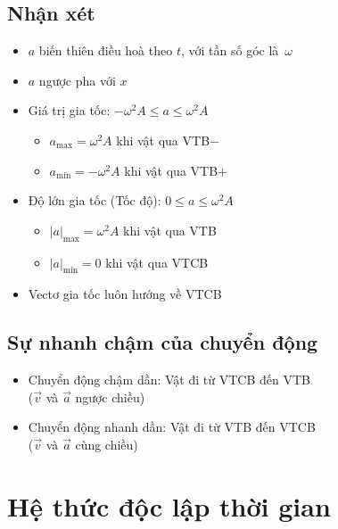\documentclass[12pt]{article}
\begin{document}
		\subsection{Nhận xét}
			\vspace{5pt}
			\begin{itemize}
				\item \(a\) biến thiên điều hoà theo \(t\), với tần số góc là \(\,\omega\)
				\item \(a\) ngược pha với \(x\)
				\item Giá trị gia tốc: \quad \( -\omega^2 A \leq a \leq \omega^2 A \)
					\begin{itemize}[label=\textopenbullet]
						\item \( a_\text{max} = \omega^2 A \) khi vật qua VTB\(-\)
						\item \( a_\text{min} = -\omega^2 A \) khi vật qua VTB\(+\)
					\end{itemize}
				\item Độ lớn gia tốc (Tốc độ): \quad \( 0 \leq a \leq \omega^2 A \)
					\begin{itemize}[label=\textopenbullet]
						\item \( {\lvert a \rvert}_\text{max} = \omega^2 A \) khi vật qua VTB
						\item \( {\lvert a \rvert}_\text{min} = 0 \) khi vật qua VTCB
					\end{itemize}
				\item Vectơ gia tốc luôn hướng về VTCB
			\end{itemize}
		\newpage
		\subsection{Sự nhanh chậm của chuyển động}
			\vspace{4pt}
			\begin{itemize}
				\item Chuyển động chậm dần: Vật đi từ VTCB đến VTB \\ [1pt] (\(\vec{v}\) và \(\vec{a}\) ngược chiều)
				\item Chuyển động nhanh dần: Vật đi từ VTB đến VTCB \\ [1pt] (\(\vec{v}\) và \(\vec{a}\) cùng chiều)
			\end{itemize}

	\section{Hệ thức độc lập thời gian}
\end{document}

